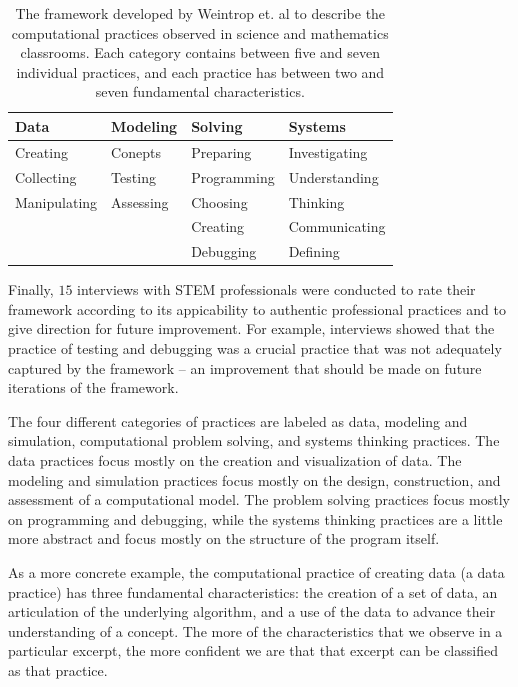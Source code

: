 \documentclass{msuphddissertation}
\begin{document}
\begin{doublespace}
\begin{table}[hb]\centering
\begin{tabular}{llll}\hline\hline
Data         & Modeling     & Solving     & Systems       \\\hline
Creating     & Conepts      & Preparing   & Investigating \\
Collecting   & Testing      & Programming & Understanding \\
Manipulating & Assessing    & Choosing    & Thinking      \\
             &              & Creating    & Communicating \\
             &              & Debugging   & Defining      \\\hline\hline
\end{tabular}
\caption{The framework developed by Weintrop et. al to describe the computational practices observed in science and mathematics classrooms.  Each category contains between five and seven individual practices, and each practice has between two and seven fundamental characteristics.}\label{CH2:Framework}
\end{table}

Finally, $15$ interviews with STEM professionals were conducted to rate their framework according to its appicability to authentic professional practices and to give direction for future improvement.  For example, interviews showed that the practice of testing and debugging was a crucial practice that was not adequately captured by the framework -- an improvement that should be made on future iterations of the framework.

The four different categories of practices are labeled as data, modeling and simulation, computational problem solving, and systems thinking practices.  The data practices focus mostly on the creation and visualization of data.  The modeling and simulation practices focus mostly on the design, construction, and assessment of a computational model.  The problem solving practices focus mostly on programming and debugging, while the systems thinking practices are a little more abstract and focus mostly on the structure of the program itself.

As a more concrete example, the computational practice of creating data (a data practice) has three fundamental characteristics: the creation of a set of data, an articulation of the underlying algorithm, and a use of the data to advance their understanding of a concept.  The more of the characteristics that we observe in a particular excerpt, the more confident we are that that excerpt can be classified as that practice.


\end{doublespace}
\end{document}
